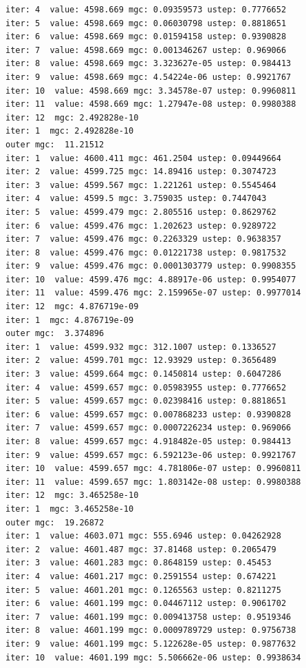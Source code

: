 \documentclass[
  letterpaper,
  DIV=11,
  numbers=noendperiod]{scrartcl}
\begin{document}
\begin{verbatim}
iter: 4  value: 4598.669 mgc: 0.09359573 ustep: 0.7776652 
iter: 5  value: 4598.669 mgc: 0.06030798 ustep: 0.8818651 
iter: 6  value: 4598.669 mgc: 0.01594158 ustep: 0.9390828 
iter: 7  value: 4598.669 mgc: 0.001346267 ustep: 0.969066 
iter: 8  value: 4598.669 mgc: 3.323627e-05 ustep: 0.984413 
iter: 9  value: 4598.669 mgc: 4.54224e-06 ustep: 0.9921767 
iter: 10  value: 4598.669 mgc: 3.34578e-07 ustep: 0.9960811 
iter: 11  value: 4598.669 mgc: 1.27947e-08 ustep: 0.9980388 
iter: 12  mgc: 2.492828e-10 
iter: 1  mgc: 2.492828e-10 
outer mgc:  11.21512 
iter: 1  value: 4600.411 mgc: 461.2504 ustep: 0.09449664 
iter: 2  value: 4599.725 mgc: 14.89416 ustep: 0.3074723 
iter: 3  value: 4599.567 mgc: 1.221261 ustep: 0.5545464 
iter: 4  value: 4599.5 mgc: 3.759035 ustep: 0.7447043 
iter: 5  value: 4599.479 mgc: 2.805516 ustep: 0.8629762 
iter: 6  value: 4599.476 mgc: 1.202623 ustep: 0.9289722 
iter: 7  value: 4599.476 mgc: 0.2263329 ustep: 0.9638357 
iter: 8  value: 4599.476 mgc: 0.01221738 ustep: 0.9817532 
iter: 9  value: 4599.476 mgc: 0.0001303779 ustep: 0.9908355 
iter: 10  value: 4599.476 mgc: 4.88917e-06 ustep: 0.9954077 
iter: 11  value: 4599.476 mgc: 2.159965e-07 ustep: 0.9977014 
iter: 12  mgc: 4.876719e-09 
iter: 1  mgc: 4.876719e-09 
outer mgc:  3.374896 
iter: 1  value: 4599.932 mgc: 312.1007 ustep: 0.1336527 
iter: 2  value: 4599.701 mgc: 12.93929 ustep: 0.3656489 
iter: 3  value: 4599.664 mgc: 0.1450814 ustep: 0.6047286 
iter: 4  value: 4599.657 mgc: 0.05983955 ustep: 0.7776652 
iter: 5  value: 4599.657 mgc: 0.02398416 ustep: 0.8818651 
iter: 6  value: 4599.657 mgc: 0.007868233 ustep: 0.9390828 
iter: 7  value: 4599.657 mgc: 0.0007226234 ustep: 0.969066 
iter: 8  value: 4599.657 mgc: 4.918482e-05 ustep: 0.984413 
iter: 9  value: 4599.657 mgc: 6.592123e-06 ustep: 0.9921767 
iter: 10  value: 4599.657 mgc: 4.781806e-07 ustep: 0.9960811 
iter: 11  value: 4599.657 mgc: 1.803142e-08 ustep: 0.9980388 
iter: 12  mgc: 3.465258e-10 
iter: 1  mgc: 3.465258e-10 
outer mgc:  19.26872 
iter: 1  value: 4603.071 mgc: 555.6946 ustep: 0.04262928 
iter: 2  value: 4601.487 mgc: 37.81468 ustep: 0.2065479 
iter: 3  value: 4601.283 mgc: 0.8648159 ustep: 0.45453 
iter: 4  value: 4601.217 mgc: 0.2591554 ustep: 0.674221 
iter: 5  value: 4601.201 mgc: 0.1265563 ustep: 0.8211275 
iter: 6  value: 4601.199 mgc: 0.04467112 ustep: 0.9061702 
iter: 7  value: 4601.199 mgc: 0.009413758 ustep: 0.9519346 
iter: 8  value: 4601.199 mgc: 0.0009789729 ustep: 0.9756738 
iter: 9  value: 4601.199 mgc: 5.122628e-05 ustep: 0.9877632 
iter: 10  value: 4601.199 mgc: 5.506662e-06 ustep: 0.9938634 

\end{verbatim}
\end{document}
